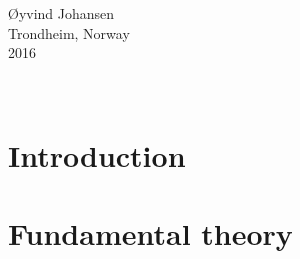 \documentclass[12pt, a4paper, twoside, openright]{report}
\renewcommand{\d}[1]{\ensuremath{\operatorname{d}\!{#1}}}
\numberwithin{equation}{chapter}
\numberwithin{figure}{chapter}
\numberwithin{table}{chapter}
\begin{document}
\begin{minipage}{0.95\textwidth}
\begin{flushright}
\O yvind Johansen \\
Trondheim, Norway \\ 
2016
\end{flushright}
\end{minipage}\\[4cm]

\newpage

\tableofcontents

\newpage


\chapter{Introduction}

\chapter{Fundamental theory}
\end{document}
